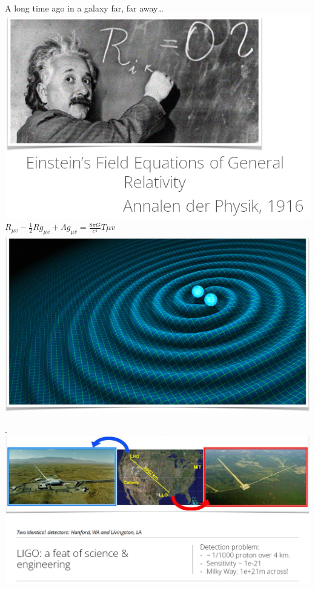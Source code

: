 \documentclass[aspectratio=169]{../latex_main/tntbeamer}  %
\begin{document}
	
	\begin{frame}{A long time ago in a galaxy far, far away…}
	    \includegraphics[scale=.5]{Bild12}\\
	    \vspace{-5cm} 
	    \hspace{8cm} $R_{\mu v} - \frac{1}{2}Rg_{\mu v} + \Lambda g_{\mu v} = \frac{8\pi G}{c^4}T\mu v$\\
	    \vspace{1cm}
	    \hspace{8.5cm}
	    \includegraphics[scale=.5]{Bild13}
	\end{frame}
	
	
	
	\begin{frame}{.}
	    \centering
	    \includegraphics[scale=.35]{Bild14}
	\end{frame}
	
\end{document}
